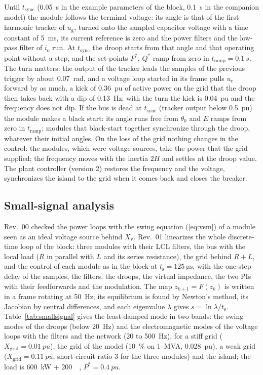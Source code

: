 \documentclass[11pt,a4paper]{scrartcl}
\newcommand{\ped}[1]{_{\mathrm{#1}}}
\begin{document}
\begin{onehalfspace}
Until $t\ped{sync}$ (\SI{0.05}{s} in the example parameters of the block, \SI{0.1}{s} in the companion model) the module follows the terminal voltage: its angle is that of the first-harmonic tracker of $u\ped{g}$, turned onto the sampled capacitor voltage with a time constant of \SI{5}{ms}, its current reference is zero and the power filters and the low-pass filter of $i\ped{o}$ run. At $t\ped{sync}$ the droop starts from that angle and that operating point without a step, and the set-points $P^*$, $Q^*$ ramp from zero in $t\ped{ramp} = \SI{0.1}{s}$. The turn matters: the output of the tracker leads the samples of the previous trigger by about \SI{0.07}{rad}, and a voltage loop started in its frame pulls $u\ped{c}$ forward by as much, a kick of \SI{0.36}{pu} of active power on the grid that the droop then takes back with a dip of \SI{0.13}{Hz}; with the turn the kick is \SI{0.04}{pu} and the frequency does not dip. If the bus is dead at $t\ped{sync}$ (tracker output below \SI{0.5}{pu}) the module makes a black start: its angle runs free from $\theta_0$ and $E$ ramps from zero in $t\ped{ramp}$; modules that black-start together synchronize through the droop, whatever their initial angles. On the loss of the grid nothing changes in the control: the modules, which were voltage sources, take the power that the grid supplied; the frequency moves with the inertia $2H$ and settles at the droop value. The plant controller (version 2) restores the frequency and the voltage, synchronizes the island to the grid when it comes back and closes the breaker.

\subsection{Small-signal analysis}
\label{sec:smallsignal}

Rev.~00 checked the power loops with the swing equation (\ref{eq:vsm}) of a module seen as an ideal voltage source behind $X\ped{v}$. Rev.~01 linearizes the whole discrete-time loop of the block: three modules with their LCL filters, the bus with the local load ($R$ in parallel with $L$ and its series resistance), the grid behind $R + L$, and the control of each module as in the block at $t\ped{s} = \SI{125}{\micro\second}$, with the one-step delay of the samples, the filters, the droops, the virtual impedance, the two PIs with their feedforwards and the modulation. The map $z_{k+1} = F(z_k)$ is written in a frame rotating at \SI{50}{Hz}; its equilibrium is found by Newton's method, its Jacobian by central differences, and each eigenvalue $\lambda$ gives $s = \ln\lambda / t\ped{s}$. Table~\ref{tab:smallsignal} gives the least-damped mode in two bands: the swing modes of the droops (below \SI{20}{Hz}) and the electromagnetic modes of the voltage loops with the filters and the network (20 to \SI{500}{Hz}), for a stiff grid ($X\ped{grid} = \SI{0.01}{pu}$), the grid of the model (\SI{10}{\percent} on \SI{1}{MVA}, \SI{0.028}{pu}), a weak grid ($X\ped{grid} = \SI{0.11}{pu}$, short-circuit ratio 3 for the three modules) and the island; the load is \SI{600}{\kilo\watt} + \SI{200}{\kilo\var}, $P^* = \SI{0.4}{pu}$.


\end{onehalfspace}
\end{document}

